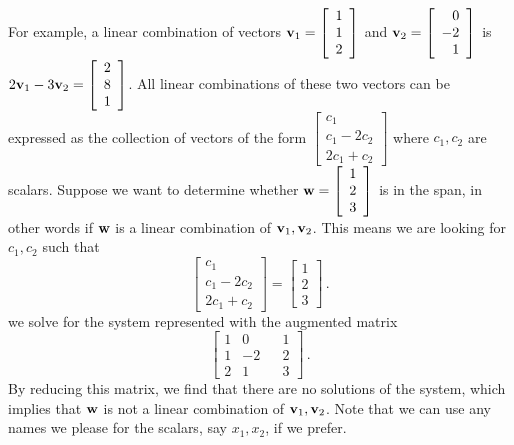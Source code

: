 For example, a linear combination of vectors $\mathbf{v}_1 = \left[ \begin{array}{c} 1\\1\\2 \end{array} \right]$ and $\mathbf{v}_2 = \left[ \begin{array}{r} 0\\-2\\1 \end{array} \right]$ is $2 \mathbf{v}_1-3\mathbf{v}_2 = \left[ \begin{array}{c} 2\\8\\1 \end{array} \right]$. All linear combinations of these two vectors can be expressed as the collection of vectors of the form $\left[ \begin{array}{c} c_1\\c_1-2c_2\\2c_1+c_2 \end{array} \right]$ where $c_1, c_2$ are scalars. Suppose we want to determine whether $\mathbf{w}=\left[ \begin{array}{c} 1\\2\\3 \end{array} \right]$ is in the span, in other words if $\mathbf{w}$ is a linear combination of $\mathbf{v}_1, \mathbf{v}_2$. This means we are looking for $c_1, c_2$ such that 
\[  \left[ \begin{array}{c} c_1\\c_1-2c_2\\2c_1+c_2 \end{array} \right] = \left[ \begin{array}{c} 1\\2\\3 \end{array} \right] \, . \]
 we solve for the system represented with the augmented matrix 
\[ \left[\begin{array}{crc|c} 1&0&&1\\ 1&-2&&2 \\ 2&1&&3\end{array} \right] \,. \]
By reducing this matrix, we find that there are no solutions of the system, which implies that $\mathbf{w}$ is not a linear combination of $\mathbf{v}_1, \mathbf{v}_2$. Note that we can use any names we please for the scalars, say $x_1, x_2$, if we prefer.



